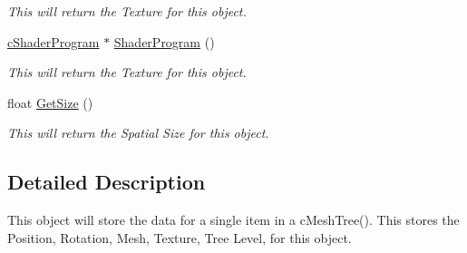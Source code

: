 \begin{DoxyCompactItemize}
\begin{DoxyCompactList}\small\item\em This will return the Texture for this object. \end{DoxyCompactList}\item 
\hypertarget{classc_mesh_tree_node_a34febea6514479d0a54a3101abbd7699}{
\hyperlink{classc_shader_program}{cShaderProgram} $\ast$ \hyperlink{classc_mesh_tree_node_a34febea6514479d0a54a3101abbd7699}{ShaderProgram} ()}
\label{classc_mesh_tree_node_a34febea6514479d0a54a3101abbd7699}

\begin{DoxyCompactList}\small\item\em This will return the Texture for this object. \end{DoxyCompactList}\item 
\hypertarget{classc_mesh_tree_node_a9e00261118c3ed9076abc38907a2e8d3}{
float \hyperlink{classc_mesh_tree_node_a9e00261118c3ed9076abc38907a2e8d3}{GetSize} ()}
\label{classc_mesh_tree_node_a9e00261118c3ed9076abc38907a2e8d3}

\begin{DoxyCompactList}\small\item\em This will return the Spatial Size for this object. \end{DoxyCompactList}\end{DoxyCompactItemize}


\subsection{Detailed Description}
This object will store the data for a single item in a cMeshTree(). This stores the Position, Rotation, Mesh, Texture, Tree Level, for this object. 